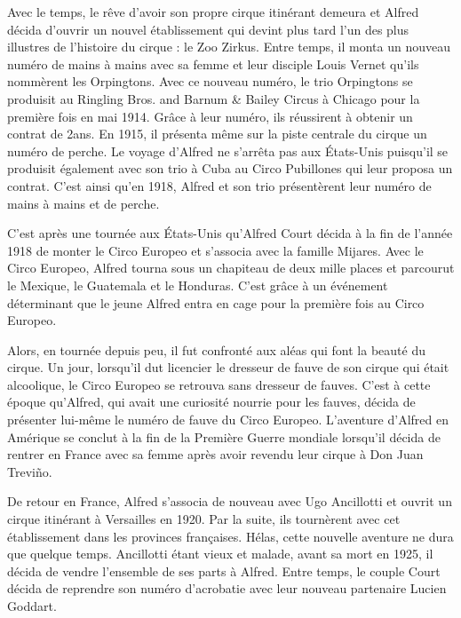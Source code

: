 Avec le temps, le rêve d’avoir son propre cirque itinérant demeura et Alfred décida d’ouvrir un nouvel établissement qui devint plus tard l’un des plus illustres de l’histoire du cirque : le Zoo Zirkus. Entre temps, il monta un nouveau numéro de mains à mains avec sa femme et leur disciple Louis Vernet qu’ils nommèrent les Orpingtons. Avec ce nouveau numéro, le trio Orpingtons se produisit au Ringling Bros. and Barnum \& Bailey Circus à Chicago pour la première fois en mai 1914. Grâce à leur numéro, ils réussirent à obtenir un contrat de 2ans. En 1915, il présenta même sur la piste centrale du cirque un numéro de perche. Le voyage d’Alfred ne s’arrêta pas aux États-Unis puisqu’il se produisit également avec son trio à Cuba au Circo Pubillones qui leur proposa un contrat. C’est ainsi qu’en 1918, Alfred et son trio présentèrent leur numéro de mains à mains et de perche.

C’est après une tournée aux États-Unis qu’Alfred Court décida à la fin de l’année 1918 de monter le Circo Europeo et s’associa avec la famille Mijares. Avec le Circo Europeo, Alfred tourna sous un chapiteau de deux mille places et parcourut le Mexique, le Guatemala et le Honduras. C’est grâce à un événement déterminant que le jeune Alfred entra en cage pour la première fois au Circo Europeo.

Alors, en tournée depuis peu, il fut confronté aux aléas qui font la beauté du cirque. Un jour, lorsqu'il dut licencier le dresseur de fauve de son cirque qui était alcoolique, le Circo Europeo se retrouva sans dresseur de fauves. C’est à cette époque qu’Alfred, qui avait une curiosité nourrie pour les fauves, décida de présenter lui-même le numéro de fauve du Circo Europeo. L’aventure d’Alfred en Amérique se conclut à la fin de la Première Guerre mondiale lorsqu’il décida de rentrer en France avec sa femme après avoir revendu leur cirque à Don Juan Treviño.

De retour en France, Alfred s’associa de nouveau avec Ugo Ancillotti et ouvrit un cirque itinérant à Versailles en 1920. Par la suite, ils tournèrent avec cet établissement dans les provinces françaises. Hélas, cette nouvelle aventure ne dura que quelque temps. Ancillotti étant vieux et malade, avant sa mort en 1925, il décida de vendre l’ensemble de ses parts à Alfred. Entre temps, le couple Court décida de reprendre son numéro d’acrobatie avec leur nouveau partenaire Lucien Goddart. 

